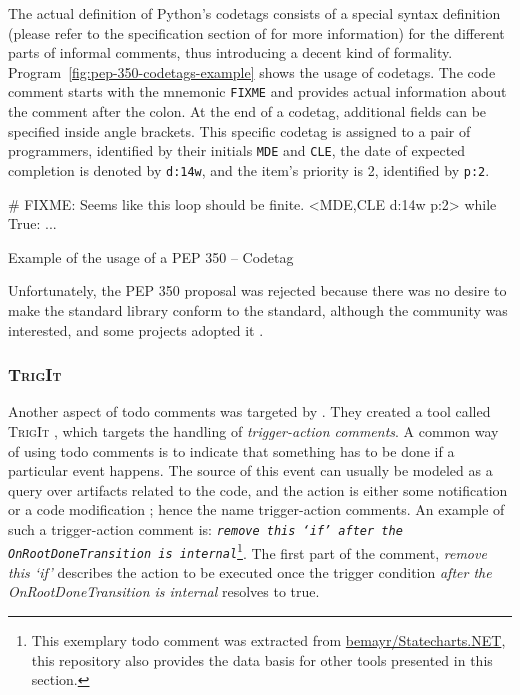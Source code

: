 The actual definition of Python's codetags consists of a special syntax definition (please refer to the specification section of \cite{elliott_pep_2005} for more information) for the different parts of informal comments, thus introducing a decent kind of formality.
Program~\ref{fig:pep-350-codetags-example} shows the usage of codetags.
The code comment starts with the mnemonic \texttt{FIXME} and provides actual information about the comment after the colon.
At the end of a codetag, additional fields can be specified inside angle brackets.
This specific codetag is assigned to a pair of programmers, identified by their initials \texttt{MDE} and \texttt{CLE}, the date of expected completion is denoted by \texttt{d:14w}, and the item's priority is 2, identified by \texttt{p:2}. 
%
\begin{program}[h]
\begin{PythonCode}
# FIXME: Seems like this loop should be finite. <MDE,CLE d:14w p:2>
while True: ...
\end{PythonCode}
\caption{Example of the usage of a PEP 350 -- Codetag}
\label{fig:pep-350-codetags-example}
\end{program}
%
Unfortunately, the PEP 350 proposal was rejected because there was no desire to make the standard library conform to the standard, although the community was interested, and some projects adopted it \cite{elliott_pep_2005}.


\subsubsection{\textsc{TrigIt}}
\label{sec:trigit}
Another aspect of todo comments was targeted by \citeauthor{nie_framework_2019}.
They created a tool called \textsc{TrigIt} \cite{nie_framework_2019}, which targets the handling of \emph{trigger-action comments}.
A common way of using todo comments is to indicate that something has to be done if a particular event happens.
The source of this event can usually be modeled as a query over artifacts related to the code, and the action is either some notification or a code modification \cite{nie_framework_2019}; hence the name trigger-action comments.
An example of such a trigger-action comment is: \emph{\texttt{remove this `if' after the OnRootDoneTransition is internal}}\footnote{This exemplary todo comment was extracted from \href{https://github.com/bemayr/Statecharts.NET}{bemayr/Statecharts.NET}, this repository also provides the data basis for other tools presented in this section.}.
The first part of the comment, \emph{remove this `if'} describes the action to be executed once the trigger condition \emph{after the OnRootDoneTransition is internal} resolves to true.

